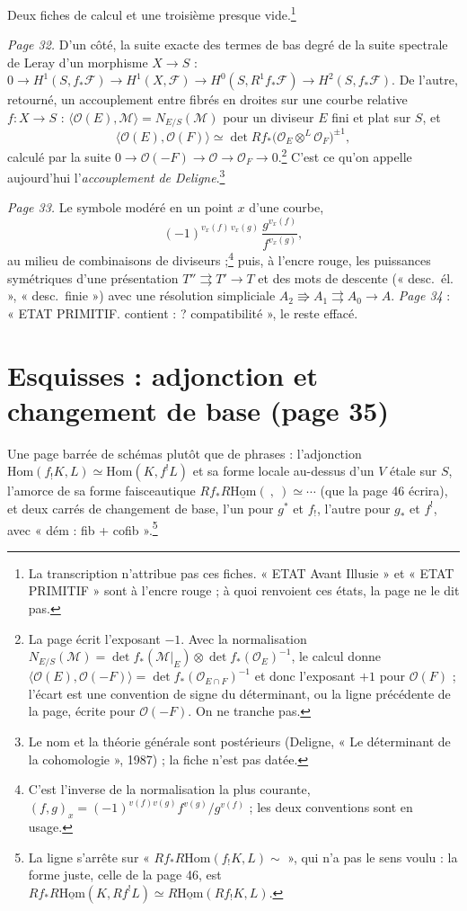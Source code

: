 \documentclass[11pt,a4paper]{article}
\begin{document}
Deux fiches de calcul et une troisième presque vide.\footnote{La
transcription n'attribue pas ces fiches. « ETAT Avant Illusie » et « ETAT
PRIMITIF » sont à l'encre rouge ; à quoi renvoient ces états, la page ne le
dit pas.}

\emph{Page 32.} D'un côté, la suite exacte des termes de bas degré de la
suite spectrale de Leray d'un morphisme $X \to S$ :
$0 \to H^1(S, f_*\mathcal{F}) \to H^1(X, \mathcal{F}) \to H^0(S, R^1f_*\mathcal{F})
\to H^2(S, f_*\mathcal{F})$. De l'autre, retourné, un accouplement entre
fibrés en droites sur une courbe relative $f\colon X \to S$ :
$\langle \mathcal{O}(E), \mathcal{M}\rangle = N_{E/S}(\mathcal{M})$ pour un
diviseur $E$ fini et plat sur $S$, et
\[
\langle \mathcal{O}(E), \mathcal{O}(F)\rangle \simeq
\det Rf_*\bigl(\mathcal{O}_E \otimes^L \mathcal{O}_F\bigr)^{\pm 1},
\]
calculé par la suite $0 \to \mathcal{O}(-F) \to \mathcal{O} \to \mathcal{O}_F
\to 0$.\footnote{La page écrit l'exposant $-1$. Avec la normalisation
$N_{E/S}(\mathcal{M}) = \det f_*(\mathcal{M}|_E) \otimes
\det f_*(\mathcal{O}_E)^{-1}$, le calcul donne $\langle \mathcal{O}(E),
\mathcal{O}(-F)\rangle = \det f_*(\mathcal{O}_{E\cap F})^{-1}$ et donc
l'exposant $+1$ pour $\mathcal{O}(F)$ ; l'écart est une convention de signe du
déterminant, ou la ligne précédente de la page, écrite pour $\mathcal{O}(-F)$.
On ne tranche pas.} C'est ce qu'on appelle aujourd'hui l'\emph{accouplement de
Deligne}.\footnote{Le nom et la théorie générale sont postérieurs (Deligne,
« Le déterminant de la cohomologie », 1987) ; la fiche n'est pas datée.}

\emph{Page 33.} Le symbole modéré en un point $x$ d'une courbe,
\[
(-1)^{v_x(f)\, v_x(g)}\, \frac{g^{v_x(f)}}{f^{v_x(g)}},
\]
au milieu de combinaisons de diviseurs ;\footnote{C'est l'inverse de la
normalisation la plus courante, $(f, g)_x = (-1)^{v(f)v(g)} f^{v(g)}/g^{v(f)}$ ;
les deux conventions sont en usage.} puis, à l'encre rouge, les puissances
symétriques d'une présentation $T'' \rightrightarrows T' \to T$ et des mots de
descente (« desc.\ él. », « desc.\ finie ») avec une résolution simpliciale
$A_2 \Rrightarrow A_1 \rightrightarrows A_0 \to A$. \emph{Page 34} : « ETAT
PRIMITIF. contient : ? compatibilité », le reste effacé.

\section*{Esquisses : adjonction et changement de base (page 35)}

Une page barrée de schémas plutôt que de phrases : l'adjonction
$\mathrm{Hom}(f_!K, L) \simeq \mathrm{Hom}(K, f^!L)$ et sa forme locale
au-dessus d'un $V$ étale sur $S$, l'amorce de sa forme faisceautique
$Rf_*R\underline{\mathrm{Hom}}(\ ,\ ) \simeq \cdots$ (que la page 46
écrira), et deux carrés de changement de base, l'un pour $g^*$ et $f_!$,
l'autre pour $g_*$ et $f^!$, avec « dém : fib + cofib ».\footnote{La ligne
s'arrête sur « $Rf_*R\mathrm{Hom}(f_!K, L) \sim$ », qui n'a pas le sens voulu :
la forme juste, celle de la page 46, est $Rf_*R\underline{\mathrm{Hom}}(K,
Rf^!L) \simeq R\underline{\mathrm{Hom}}(Rf_!K, L)$.}
\end{document}
